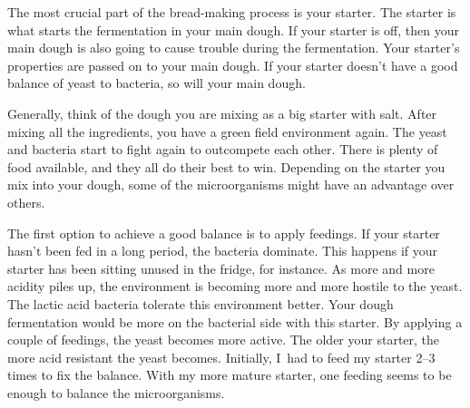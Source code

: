 The most crucial part of the bread-making process is your starter.
The starter is what starts the fermentation in your main dough.
If your starter is off, then your main dough is also going
to cause trouble during the fermentation. Your starter's
properties are passed on to your main dough. If your starter
doesn't have a good balance of yeast to bacteria, so will your
main dough.

\begin{flowchart}[!htb]
\centering
  
  \caption[Process to prepare your starter before baking]{The process to check
      your sourdough starter when making wheat-based doughs. In practice
      I~frequently use a stiff sourdough starter. The stiff starter features
      enhanced yeast activity. In that case, you can use the same ratios as
      shown in the chart except for the water quantity. The stiff starter has
      a hydration of \qtyrange{50}{60}{\percent}. So you would have half the
      shown water quantities, i.e., if the chart shows \qty{100}{\gram} of
      water, use \qtyrange{50}{60}{\gram} of water for your stiff starter.}%
  \label{fig:process-starter-wheat-sourdough}
\end{flowchart}

Generally, think of the dough you are mixing as a big starter with salt.
After mixing all the ingredients, you have a green field environment again.
The yeast and bacteria start to fight again to outcompete each other.
There is plenty of food available, and they all do their best to win.
Depending on the starter you mix into your dough, some of the microorganisms
might have an advantage over others.

The first option to achieve a good balance is to apply feedings.
If your starter hasn't been fed in a long period, the
bacteria dominate. This happens if your starter has been
sitting unused in the fridge, for instance. As more and more
acidity piles up, the environment is becoming more and more hostile
to the yeast. The lactic acid bacteria tolerate this environment
better. Your dough fermentation would be more on the
bacterial side with this starter. By applying a couple of
feedings, the yeast becomes more active. The older your
starter, the more acid resistant the yeast becomes. Initially,
I~had to feed my starter 2--3 times to fix the balance. With my
more mature starter, one feeding seems to be enough to balance
the microorganisms.

